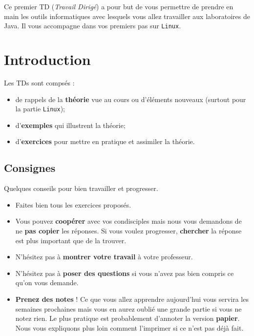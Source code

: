 \documentclass[a4paper,11pt]{article}
\date{2018 -- 2019}
\begin{document}
\entete
\titre
{}
\lastedit


	\begin{tcolorbox}[blanker,
	before skip=10mm,after skip=10mm,
	borderline west={1mm}{-4mm}{lightgray},
	title=Objectifs, coltitle=black, fonttitle=\sffamily\bfseries\large]
	Ce premier TD (\textit{Travail Dirigé}) a pour but de vous permettre de prendre en main les outils informatiques 
	avec lesquels vous allez travailler aux laboratoires de Java. Il vous accompagne dans vos premiers pas sur \verb_Linux_.
	\end{tcolorbox}
	
	\tableofcontents

	\newpage

\section{Introduction}
Les TDs sont compsés :
\par
\begin{itemize}
\item de rappels de la \textbf{théorie} vue au cours ou d'éléments nouveaux (surtout pour la partie \verb_Linux_); 
\item d'\textbf{exemples} qui illustrent la théorie;
\item d'\textbf{exercices} pour mettre en pratique et assimiler la théorie.
\end{itemize}

\subsection{Consignes}
Quelques conseils pour bien travailler et progresser.
\par
\begin{itemize}
\item Faites bien tous les exercices proposés.
\item Vous pouvez \textbf{coopérer} avec vos condisciples mais nous vous demandons de ne \textbf{pas copier} les réponses. Si vous voulez progresser, \textbf{chercher} la réponse est plus important que de la trouver. 
\item N'hésitez pas à \textbf{montrer votre travail} à votre professeur.
\item N'hésitez pas à \textbf{poser des questions} si vous n'avez pas bien compris ce qu'on vous demande.
\item \textbf{Prenez des notes} ! Ce que vous allez apprendre aujourd'hui vous servira les semaines prochaines mais vous en aurez oublié une grande partie si vous ne notez rien. Le plus pratique est probablement d'annoter la version \textbf{papier}. Nous vous expliquons plus loin comment l'imprimer si ce n'est pas déjà fait.
\end{itemize}
\end{document}
